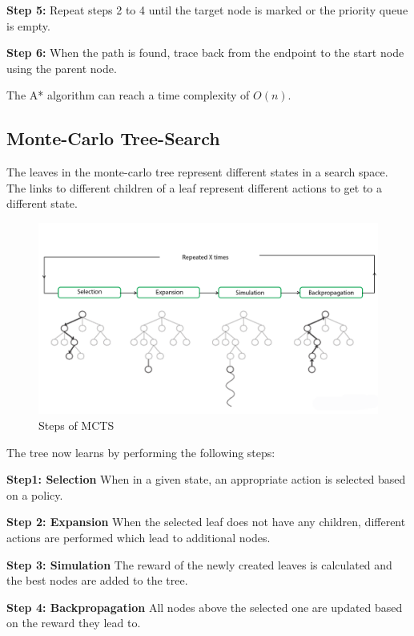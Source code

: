 \documentclass[bibliography=totoc]{scrartcl}
\begin{document}
\textbf{Step 5:} Repeat steps 2 to 4 until the target node is marked or the priority queue is empty.

\textbf{Step 6:} When the path is found, trace back from the endpoint to the start node using the parent node.

The A* algorithm can reach a time complexity of $O(n)$.

\subsection{Monte-Carlo Tree-Search}
The leaves in the monte-carlo tree represent different states in a search space. The links to different children of a leaf represent different actions to get to a different state.

\begin{figure}[H]
	\centering
	\includegraphics[width = {\textwidth}]{img/mcts_steps.png}
	\caption{Steps of \ac{MCTS}}
	\label{fig:MCTS}
\end{figure}

The tree now learns by performing the following steps:

\textbf{Step1: Selection} When in a given state, an appropriate action is selected based on a policy.

\textbf{Step 2: Expansion} When the selected leaf does not have any children, different actions are performed which lead to additional nodes.

\textbf{Step 3: Simulation} The reward of the newly created leaves is calculated and the best nodes are added to the tree.

\textbf{Step 4: Backpropagation} All nodes above the selected one are updated based on the reward they lead to.
\end{document}
